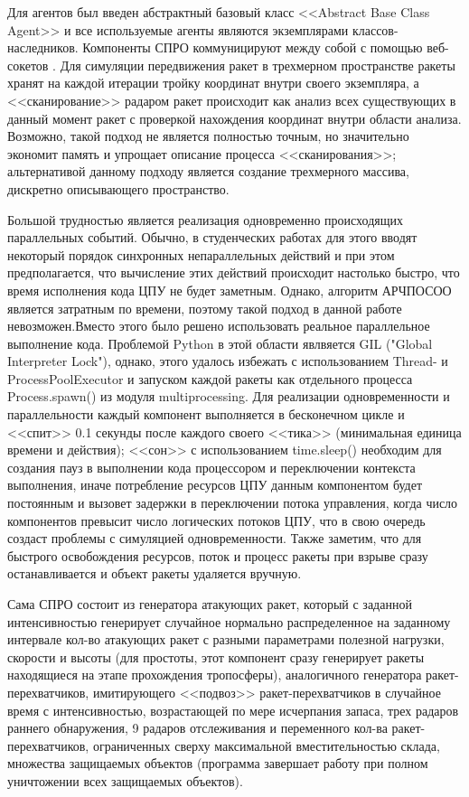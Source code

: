 Для агентов был введен абстрактный базовый класс <<Abstract Base Class Agent>> и  все используемые агенты являются экземплярами классов-наследников. Компоненты СПРО коммуницируют между собой с помощью веб-сокетов \cite{websockets:git}. Для симуляции передвижения ракет в трехмерном пространстве ракеты хранят на каждой итерации тройку координат внутри своего экземпляра, а <<сканирование>> радаром ракет происходит как анализ всех существующих в данный момент ракет с проверкой нахождения координат внутри области анализа. Возможно, такой подход не является полностью точным, но значительно экономит память и упрощает описание процесса <<сканирования>>; альтернативой данному подходу является создание трехмерного массива, дискретно описывающего пространство. 


Большой трудностью является реализация  одновременно происходящих параллельных событий. Обычно, в студенческих работах  для этого вводят некоторый порядок синхронных непараллельных действий и при этом предполагается, что вычисление этих действий происходит настолько быстро, что время исполнения кода ЦПУ не будет заметным. Однако, алгоритм АРЧПОСОО является затратным по времени, поэтому такой подход в данной работе невозможен.Вместо этого было решено использовать реальное параллельное выполнение кода. Проблемой Python в этой области явлвяется GIL ("Global Interpreter Lock"), однако, этого удалось избежать с использованием Thread- и ProcessPoolExecutor  и запуском каждой ракеты как отдельного процесса  Process.spawn() из модуля multiprocessing. Для реализации одновременности и параллельности каждый компонент выполняется в бесконечном цикле и <<спит>> 0.1 секунды после каждого своего <<тика>> (минимальная единица времени и действия); <<сон>>  с использованием time.sleep() необходим для создания пауз в выполнении кода процессором и переключении контекста выполнения, иначе  потребление ресурсов ЦПУ данным компонентом будет постоянным и вызовет задержки в переключении потока управления, когда число компонентов превысит число логических потоков ЦПУ, что в свою очередь создаст проблемы с симуляцией одновременности. Также заметим, что для быстрого освобождения ресурсов, поток и процесс ракеты при взрыве сразу останавливается и объект ракеты удаляется вручную.

Сама СПРО состоит из генератора атакующих ракет, который с заданной интенсивностью генерирует случайное нормально распределенное на заданному интервале кол-во атакующих ракет с разными параметрами полезной нагрузки, скорости и высоты (для простоты, этот компонент сразу генерирует ракеты находящиеся на этапе прохождения тропосферы), аналогичного генератора ракет-перехватчиков, имитирующего <<подвоз>>  ракет-перехватчиков в случайное время с интенсивностью, возрастающей по мере исчерпания запаса, трех радаров раннего обнаружения, 9 радаров отслеживания и переменного кол-ва ракет-перехватчиков, ограниченных сверху максимальной вместительностью склада, множества защищаемых объектов (программа завершает работу при полном уничтожении всех защищаемых объектов).

